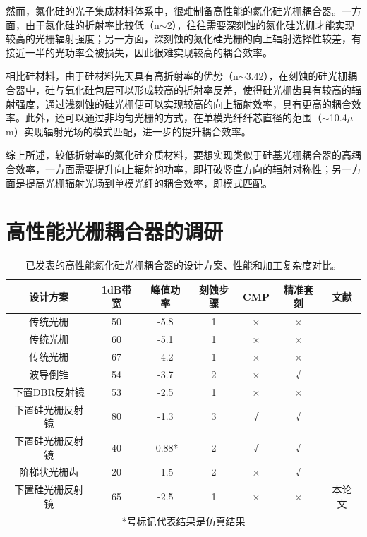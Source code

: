 然而，氮化硅的光子集成材料体系中，很难制备高性能的氮化硅光栅耦合器。一方面，由于氮化硅的折射率比较低（n$\sim$2），往往需要深刻蚀的氮化硅光栅才能实现较高的光栅辐射强度；另一方面，深刻蚀的氮化硅光栅的向上辐射选择性较差，有接近一半的光功率会被损失，因此很难实现较高的耦合效率。

相比硅材料，由于硅材料先天具有高折射率的优势（n$\sim$3.42），在刻蚀的硅光栅耦合器中，硅与氧化硅包层可以形成较高的折射率反差，使得硅光栅齿具有较高的辐射强度，通过浅刻蚀的硅光栅便可以实现较高的向上辐射效率，具有更高的耦合效率。此外，还可以通过非均匀光栅的方式，在单模光纤纤芯直径的范围（$\sim$10.4$\mu$m）实现辐射光场的模式匹配，进一步的提升耦合效率。

综上所述，较低折射率的氮化硅介质材料，要想实现类似于硅基光栅耦合器的高耦合效率，一方面需要提升向上辐射的功率，即打破竖直方向的辐射对称性；另一方面是提高光栅辐射光场到单模光纤的耦合效率，即模式匹配。

\section{高性能光栅耦合器的调研}


\begin{table}[!htbp]
    \caption{已发表的高性能氮化硅光栅耦合器的设计方案、性能和加工复杂度对比。}
    \label{tab:1}
    \centering
    \footnotesize%
    \setlength{\tabcolsep}{4pt}%
    \renewcommand{\arraystretch}{1.2}%
\begin{tabular}{ccccccc}
设计方案          &1dB带宽 & 峰值功率  & 刻蚀步骤 & CMP & 精准套刻 & 文献       \\ \hline
传统光栅          & 50    & -5.8   & 1    & ×   & ×    & \cite{Shainline2017Room}     \\
传统光栅          & 60    & -5.1   & 1    & ×   & ×    & \cite{Zhang2014High} \\
传统光栅          & 67    & -4.2   & 1    & ×   & ×    & \cite{Doerr2010Wide} \\
波导倒锥          & 54    & -3.7   & 2    & ×   & √    & \cite{Cheng2016Compact} \\
下置DBR反射镜      & 53    & -2.5   & 1    & ×   & ×    & \cite{Huijuan2014Efficient} \\
下置硅光栅反射镜      & 80    & -1.3   & 3    & √   & √    & \cite{Sacher2014Wide}\\
下置硅光栅反射镜      & 40    & -0.88* & 2    & √   & √    & \cite{Jinghui2015Ultra} \\
阶梯状光栅齿        & 20    & -1.5   & 2    & ×   & √    & \cite{Chen2016High,Chen2017Experimental} \\
下置硅光栅反射镜     & 65    & -2.5   & 1    & ×   & ×    & 本论文      \\
\multicolumn{7}{c}{*号标记代表结果是仿真结果}        
\end{tabular}
\end{table}


